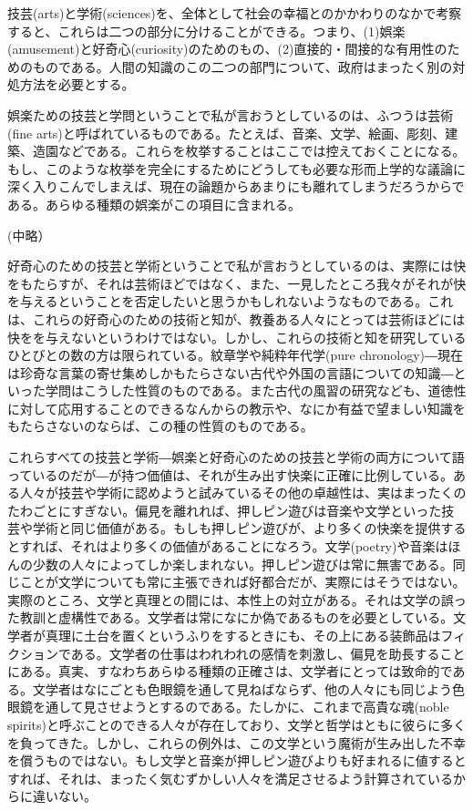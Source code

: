 \documentclass[uplatex,dvipdfmx]{jsarticle}
\begin{document}
\vspace{2zw} 技芸(arts)と学術(sciences)を、全体として社会の幸福とのかかわりのなかで考察すると、これらは二つの部分に分けることができる。つまり、(1)娯楽(amusement)と好奇心(curiosity)のためのもの、(2)直接的・間接的な有用性のためのものである。人間の知識のこの二つの部門について、政府はまったく別の対処方法を必要とする。

娯楽ための技芸と学問ということで私が言おうとしているのは、ふつうは芸術(fine arts)と呼ばれているものである。たとえば、音楽、文学、絵画、彫刻、建築、造園などである。これらを枚挙することはここでは控えておくことになる。もし、このような枚挙を完全にするためにどうしても必要な形而上学的な議論に深く入りこんでしまえば、現在の論題からあまりにも離れてしまうだろうからである。あらゆる種類の娯楽がこの項目に含まれる。

(中略）

好奇心のための技芸と学術ということで私が言おうとしているのは、実際には快をもたらすが、それは芸術ほどではなく、また、一見したところ我々がそれが快を与えるということを否定したいと思うかもしれないようなものである。これは、これらの好奇心のための技術と知が、教養ある人々にとっては芸術ほどには快をを与えないというわけではない。しかし、これらの技術と知を研究しているひとびとの数の方は限られている。紋章学や純粋年代学(pure chronology){\――}現在は珍奇な言葉の寄せ集めしかもたらさない古代や外国の言語についての知識{\――}といった学問はこうした性質のものである。また古代の風習の研究なども、道徳性に対して応用することのできるなんからの教示や、なにか有益で望ましい知識をもたらさないのならば、この種の性質のものである。

これらすべての技芸と学術{\――}娯楽と好奇心のための技芸と学術の両方について語っているのだが{\――}が持つ価値は、それが生み出す快楽に正確に比例している。ある人々が技芸や学術に認めようと試みているその他の卓越性は、実はまったくのたわごとにすぎない。偏見を離れれば、押しピン遊びは音楽や文学といった技芸や学術と同じ価値がある。もしも押しピン遊びが、より多くの快楽を提供するとすれば、それはより多くの価値があることになろう。文学(poetry)や音楽はほんの少数の人々によってしか楽しまれない。押しピン遊びは常に無害である。同じことが文学についても常に主張できれば好都合だが、実際にはそうではない。実際のところ、文学と真理との間には、本性上の対立がある。それは文学の誤った教訓と虚構性である。文学者は常になにか偽であるものを必要としている。文学者が真理に土台を置くというふりをするときにも、その上にある装飾品はフィクションである。文学者の仕事はわれわれの感情を刺激し、偏見を助長することにある。真実、すなわちあらゆる種類の正確さは、文学者にとっては致命的である。文学者はなにごとも色眼鏡を通して見ねばならず、他の人々にも同じよう色眼鏡を通して見させようとするのである。たしかに、これまで高貴な魂(noble spirits)と呼ぶことのできる人々が存在しており、文学と哲学はともに彼らに多くを負ってきた。しかし、これらの例外は、この文学という魔術が生み出した不幸を償うものではない。もし文学と音楽が押しピン遊びよりも好まれるに値するとすれば、それは、まったく気むずかしい人々を満足させるよう計算されているからに違いない。
\end{document}

